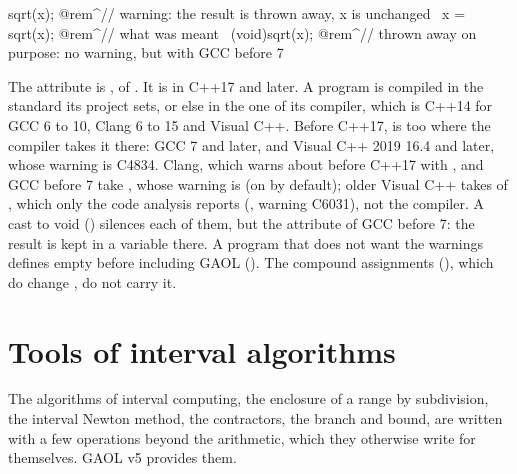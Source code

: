 \begin{example}
sqrt(x);        @rem^// warning: the result is thrown away, x is unchanged~
x = sqrt(x);    @rem^// what was meant~
(void)sqrt(x);  @rem^// thrown away on purpose: no warning, but with GCC before 7~
\end{example}

\noindent
The attribute is , of . It is
\code{[[nodiscard]]} in C++17 and later. A program is compiled in the standard
its project sets, or else in the one of its compiler, which is C++14 for GCC 6
to 10, Clang 6 to 15 and Visual C++. Before C++17,  is
\code{[[nodiscard]]} too where the compiler takes it there: GCC 7 and later,
and Visual C++ 2019 16.4 and later, whose warning is C4834. Clang, which warns
about \code{[[nodiscard]]} before C++17 with , and GCC
before 7 take , whose warning
is  (on by default); older Visual C++ takes
 of , which only the code analysis
reports (, warning C6031), not the compiler. A cast to void
() silences each of them, but the attribute of GCC
before 7: the result is kept in a variable there. A program that does not
want the warnings defines  empty before including GAOL
(). The compound assignments (), which
do change , do not carry it.

\section{Tools of interval algorithms}\label{sec:tools}
%
%
%

The algorithms of interval computing, the enclosure of a range by
subdivision, the interval Newton method, the contractors, the branch and
bound, are written with a few operations beyond the arithmetic, which they
otherwise write for themselves. GAOL v5 provides them.\newinvfive

